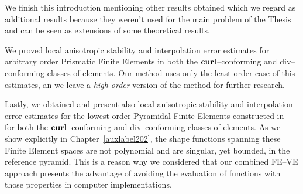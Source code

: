 We finish this introduction mentioning other results obtained which we regard
as additional results because they weren't used
for the main problem
of the Thesis and can be seen as extensions of some theoretical results.

We proved local anisotropic 
stability and
interpolation error estimates for arbitrary order Prismatic Finite Elements in both
the $\textbf{curl}$--conforming and div--conforming classes of elements. 
Our method uses only
the least order case of this estimates, an we leave a \emph{high order} version
of the method for further research.

Lastly, we obtained and present also local anisotropic stability
and interpolation error estimates for the lowest order Pyramidal
Finite Elements constructed in~\cite{gh99, Nigam-2012} for both
the $\textbf{curl}$--conforming and div--conforming classes of elements. As we show
explicitly in Chapter~\ref{auxlabel202}, the shape functions 
spanning these Finite Element spaces are not polynomial and are singular, yet bounded,
in the reference pyramid. This is a reason why we considered that
our combined FE--VE approach presents the advantage of avoiding the evaluation
of functions with those properties in computer implementations.   

